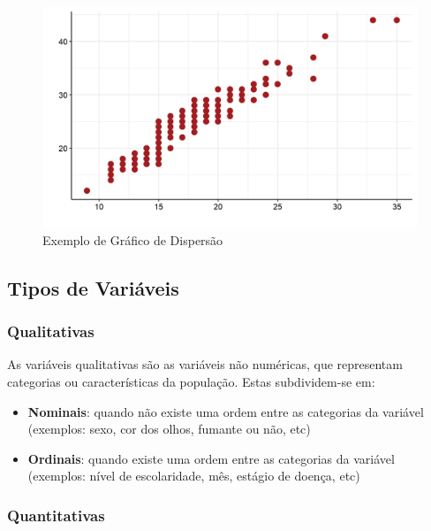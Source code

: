 \documentclass[
]{estat/estat}
\providecommand{\tightlist}{%
  \setlength{\itemsep}{0pt}\setlength{\parskip}{0pt}}\usepackage{longtable,booktabs,array}
\begin{document}
\begin{figure}

{\centering \includegraphics{images/disp_uni.png}

}

\caption{Exemplo de Gráfico de Dispersão}

\end{figure}

\hypertarget{tipos-de-variuxe1veis}{%
\subsection{Tipos de Variáveis}\label{tipos-de-variuxe1veis}}

\hypertarget{qualitativas}{%
\subsubsection{Qualitativas}\label{qualitativas}}

As variáveis qualitativas são as variáveis não numéricas, que
representam categorias ou características da população. Estas
subdividem-se em:

\begin{itemize}
\tightlist
\item
  \textbf{Nominais}: quando não existe uma ordem entre as categorias da
  variável (exemplos: sexo, cor dos olhos, fumante ou não, etc)
\item
  \textbf{Ordinais}: quando existe uma ordem entre as categorias da
  variável (exemplos: nível de escolaridade, mês, estágio de doença,
  etc)
\end{itemize}

\hypertarget{quantitativas}{%
\subsubsection{Quantitativas}\label{quantitativas}}
\end{document}
